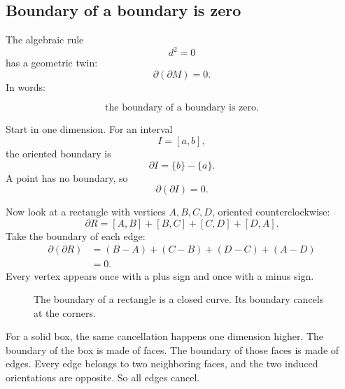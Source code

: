 \subsection{Boundary of a boundary is zero}

The algebraic rule
\[
    d^2=0
\]
has a geometric twin:
\[
\boxed{
    \partial(\partial M)=0.
}
\]
In words:

\[
\boxed{
    \text{the boundary of a boundary is zero.}
}
\]

Start in one dimension.  For an interval
\[
    I=[a,b],
\]
the oriented boundary is
\[
    \partial I=\{b\}-\{a\}.
\]
A point has no boundary, so
\[
    \partial(\partial I)=0.
\]

Now look at a rectangle with vertices \(A,B,C,D\), oriented counterclockwise:
\[
    \partial R=[A,B]+[B,C]+[C,D]+[D,A].
\]
Take the boundary of each edge:
\[
\begin{aligned}
\partial(\partial R)
&=
(B-A)+(C-B)+(D-C)+(A-D)\\
&=
0.
\end{aligned}
\]
Every vertex appears once with a plus sign and once with a minus sign.

\begin{figure}[h]
\centering
{}
\caption{The boundary of a rectangle is a closed curve.  Its boundary cancels at the
corners.}
\end{figure}

For a solid box, the same cancellation happens one dimension higher.  The boundary of
the box is made of faces.  The boundary of those faces is made of edges.  Every edge
belongs to two neighboring faces, and the two induced orientations are opposite.
So all edges cancel.

